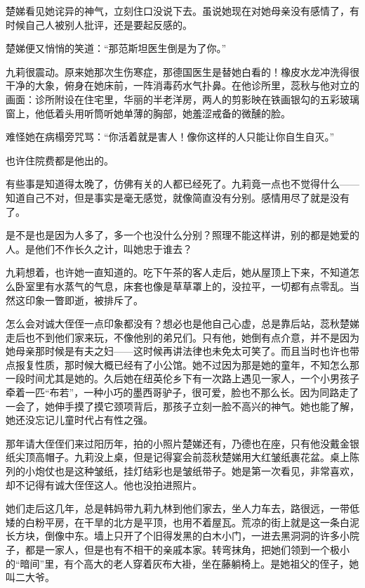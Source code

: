\par 楚娣看见她诧异的神气，立刻住口没说下去。虽说她现在对她母亲没有感情了，有时候自己人被别人批评，还是要起反感的。
\par 楚娣便又悄悄的笑道：“那范斯坦医生倒是为了你。”
\par 九莉很震动。原来她那次生伤寒症，那德国医生是替她白看的！橡皮水龙冲洗得很干净的大象，俯身在她床前，一阵消毒药水气扑鼻。在他诊所里，蕊秋与他对立的画面：诊所附设在住宅里，华丽的半老洋房，两人的剪影映在铁画银勾的五彩玻璃窗上，他低着头用听筒听她单薄的胸部，她羞涩戒备的微醺的脸。
\par 难怪她在病榻旁咒骂：“你活着就是害人！像你这样的人只能让你自生自灭。”
\par 也许住院费都是他出的。
\par 有些事是知道得太晚了，仿佛有关的人都已经死了。九莉竟一点也不觉得什么——知道自己不对，但是事实是毫无感觉，就像简直没有分别。感情用尽了就是没有了。
\par 是不是也是因为人多了，多一个也没什么分别？照理不能这样讲，别的都是她爱的人。是他们不作长久之计，叫她忠于谁去？
\par 九莉想着，也许她一直知道的。吃下午茶的客人走后，她从屋顶上下来，不知道怎么卧室里有水蒸气的气息，床套也像是草草罩上的，没拉平，一切都有点零乱。当然这印象一瞥即逝，被排斥了。
\par 怎么会对诚大侄侄一点印象都没有？想必也是他自己心虚，总是靠后站，蕊秋楚娣走后也不到他们家来玩，不像他别的弟兄们。只有他，她倒有点介意，并不是因为她母亲那时候是有夫之妇——这时候再讲法律也未免太可笑了。而且当时也许也带点报复性质，那时候大概已经有了小公馆。她不过因为那是她的童年，不知怎么那一段时间尤其是她的。久后她在纽英伦乡下有一次路上遇见一家人，一个小男孩子牵着一匹“布若”，一种小巧的墨西哥驴子，很可爱，脸也不那么长。因为同路走了一会了，她伸手摸了摸它颈项背后，那孩子立刻一脸不高兴的神气。她也能了解，她还没忘记儿童时代占有性之强。
\par 那年请大侄侄们来过阳历年，拍的小照片楚娣还有，乃德也在座，只有他没戴金银纸尖顶高帽子。九莉没上桌，但是记得宴会前蕊秋楚娣用大红皱纸裹花盆。桌上陈列的小炮仗也是这种皱纸，挂灯结彩也是皱纸带子。她是第一次看见，非常喜欢，却不记得有诚大侄侄这人。他也没拍进照片。
\par 她们走后这几年，总是韩妈带九莉九林到他们家去，坐人力车去，路很远，一带低矮的白粉平房，在干旱的北方是平顶，也用不着屋瓦。荒凉的街上就是这一条白泥长方块，倒像中东。墙上只开了个旧得发黑的白木小门，一进去黑洞洞的许多小院子，都是一家人，但是也有不相干的亲戚本家。转弯抹角，把她们领到一个极小的“暗间”里，有个高大的老人穿着灰布大褂，坐在藤躺椅上。是她祖父的侄子，她叫二大爷。
